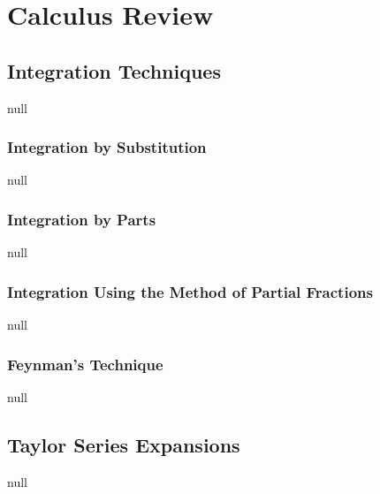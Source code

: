 \chapter{Calculus Review}
\section{Integration Techniques}
null
\subsection{Integration by Substitution}
null
\subsection{Integration by Parts}
null
\subsection{Integration Using the Method of Partial Fractions}
null
\subsection{Feynman's Technique}
null
\section{Taylor Series Expansions}
null
